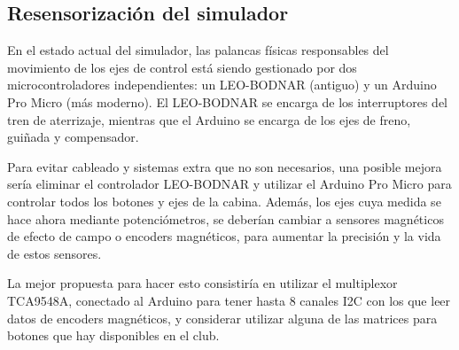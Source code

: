 \documentclass[10pt, oneside]{trabajo}
\begin{document}
\subsection{Resensorización del simulador}
En el estado actual del simulador, las palancas físicas responsables del movimiento de los ejes de control está siendo gestionado por dos microcontroladores independientes: un LEO-BODNAR (antiguo) y un Arduino Pro Micro (más moderno). El LEO-BODNAR se encarga de los interruptores del tren de aterrizaje, mientras que el Arduino se encarga de los ejes de freno, guiñada y compensador. 
\par Para evitar cableado y sistemas extra que no son necesarios, una posible mejora sería eliminar el controlador LEO-BODNAR y utilizar el Arduino Pro Micro para controlar todos los botones y ejes de la cabina. Además, los ejes cuya medida se hace ahora mediante potenciómetros, se deberían cambiar a sensores magnéticos de efecto de campo o encoders magnéticos, para aumentar la precisión y la vida de estos sensores.
\par La mejor propuesta para hacer esto consistiría en utilizar el multiplexor TCA9548A, conectado al Arduino para tener hasta 8 canales I2C con los que leer datos de encoders magnéticos, y considerar utilizar alguna de las matrices para botones que hay disponibles en el club.

\newpage
\listoftodos
\end{document}
